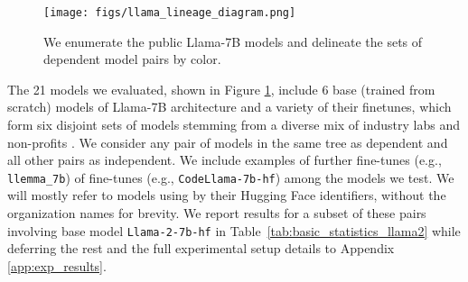 \begin{figure}
    \centering
    \texttt{[image: figs/llama\_lineage\_diagram.png]}
    \caption{We enumerate the public Llama-7B models and delineate the sets of dependent model pairs by color.}
    \label{fig:model-lineage-forest}
\end{figure}

The 21 models we evaluated, shown in Figure \ref{fig:model-lineage-forest}, include 6 base (trained from scratch) models of Llama-7B architecture and a variety of their finetunes, which form six disjoint sets of models stemming from a diverse mix of industry labs and non-profits \citep{azerbayev2024llemmaopenlanguagemodel, sudalairaj2024lablargescalealignmentchatbots, liu2023llm360, li2023camelcommunicativeagentsmind}.
We consider any pair of models in the same tree as dependent and all other pairs as independent.
We include examples of further fine-tunes (e.g., \texttt{llemma\_7b}) of fine-tunes (e.g., \texttt{CodeLlama-7b-hf}) among the models we test.
We will mostly refer to models using by their Hugging Face identifiers, without the organization names for brevity.
We report results for a subset of these pairs involving base model \texttt{Llama-2-7b-hf} in Table~\ref{tab:basic_statistics_llama2} while deferring the rest and the full experimental setup details to Appendix \ref{app:exp_results}.

